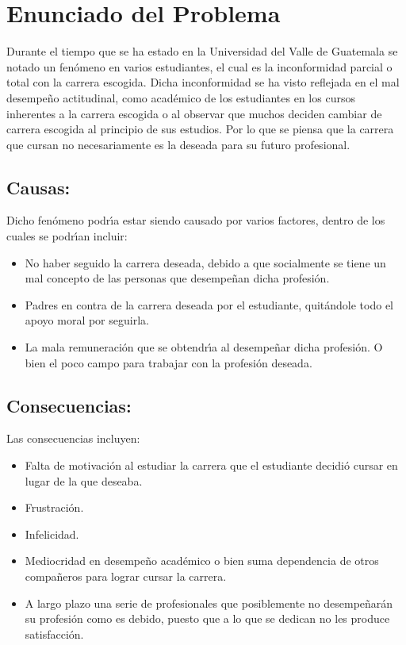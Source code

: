 %

\section{Enunciado del Problema}

Durante el tiempo que se ha estado en la Universidad del Valle de Guatemala se notado un fen\'{o}meno en varios estudiantes, el cual es la inconformidad parcial o total con la carrera escogida. Dicha inconformidad se ha visto reflejada en el mal desempe\~{n}o actitudinal, como acad\'{e}mico de los estudiantes en los cursos inherentes a la carrera escogida o al observar que muchos deciden cambiar de carrera  escogida al principio de sus estudios. Por lo que se piensa que la carrera que cursan no necesariamente es la deseada para su futuro profesional.\\

\subsection{\textbf{Causas:}} Dicho fen\'{o}meno podr\'{\i}a estar siendo causado por varios factores, dentro de los cuales se podr\'{\i}an incluir:
\begin{itemize}
	\item No haber seguido la carrera deseada, debido a que socialmente se tiene un mal concepto de las personas que desempe\~{n}an dicha profesi\'{o}n. 
	\item Padres en contra de la carrera deseada por el estudiante, quit\'{a}ndole todo el apoyo moral por seguirla. 
	\item La mala remuneraci\'{o}n que se obtendr\'{\i}a al desempe\~{n}ar dicha profesi\'{o}n. O bien el poco campo para trabajar con la profesi\'{o}n deseada.
\end{itemize}

\subsection{\textbf{Consecuencias:}} Las consecuencias incluyen:
\begin{itemize}
	\item Falta de motivaci\'{o}n al estudiar la carrera que el estudiante decidi\'{o} cursar en lugar de la que deseaba. 
	\item Frustraci\'{o}n.
	\item Infelicidad.
	\item Mediocridad en desempe\~{n}o acad\'{e}mico o bien suma dependencia de otros compa\~{n}eros para lograr cursar la carrera.
	\item A largo plazo una serie de profesionales que posiblemente no desempe\~{n}ar\'{a}n su profesi\'{o}n como es debido, puesto que a lo que se dedican no les produce satisfacci\'{o}n. 
\end{itemize}

